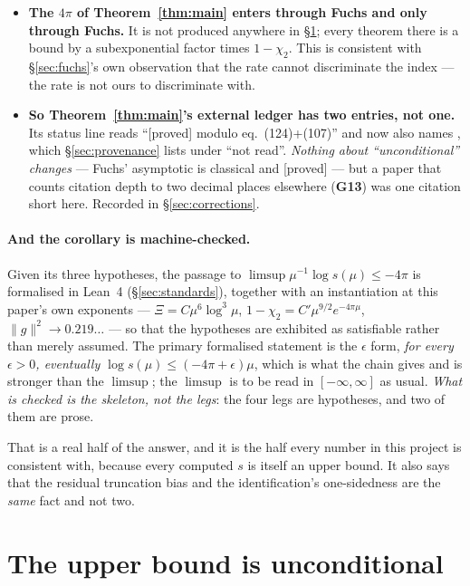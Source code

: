 \documentclass[11pt,a4paper]{article}
\theoremstyle{plain}
\theoremstyle{definition}
\theoremstyle{remark}
\newcommand{\st}[1]{{\normalfont\sffamily\footnotesize[#1]}}
\newcommand{\proved}{\st{proved}}
\begin{document}
\begin{itemize}\itemsep2pt
\item \textbf{The $4\pi$ of Theorem~\ref{thm:main} enters through Fuchs and only
through Fuchs.}  It is not produced anywhere in \S\ref{sec:unconditional}; every
theorem there is a bound by a subexponential factor times $1-\chi_2$.  This is
consistent with \S\ref{sec:fuchs}'s own observation that the rate cannot
discriminate the index --- the rate is not ours to discriminate with.
\item \textbf{So Theorem~\ref{thm:main}'s external ledger has two entries, not
one.}  Its status line reads ``\proved{} modulo \cite{Dunster2017} eq.\
(124)+(107)'' and now also names \cite{Fuchs1964}, which
\S\ref{sec:provenance} lists under ``not read''.  \emph{Nothing about ``unconditional'' changes} ---
Fuchs' asymptotic is classical and \proved{} --- but a paper that counts citation
depth to two decimal places elsewhere (\textbf{G13}) was one citation short here.
Recorded in \S\ref{sec:corrections}.
\end{itemize}

\paragraph{And the corollary is machine-checked.}  Given its three hypotheses,
the passage to $\limsup\mu^{-1}\log s(\mu)\le-4\pi$ is formalised in Lean~4
(\S\ref{sec:standards}), together with an instantiation at this paper's own
exponents --- $\Xi=C\mu^6\log^3\!\mu$, $1-\chi_2=C'\mu^{9/2}e^{-4\pi\mu}$,
$\|g\|^2\to0.219\ldots$ --- so that the hypotheses are exhibited as satisfiable
rather than merely assumed.  The primary formalised statement is the $\epsilon$
form, \emph{for every $\epsilon>0$, eventually $\log s(\mu)\le(-4\pi+\epsilon)\mu$},
which is what the chain gives and is stronger than the $\limsup$; the $\limsup$
is to be read in $[-\infty,\infty]$ as usual.  \emph{What is checked is the
skeleton, not the legs}: the four legs are hypotheses, and two of them are
prose.

That is a real half of the answer, and it is the half every number in this
project is consistent with, because every computed $s$ is itself an upper bound.
It also says that the residual truncation bias and the identification's
one-sidedness are the \emph{same} fact and not two.

\section{The upper bound is unconditional}
\label{sec:unconditional}
\end{document}
